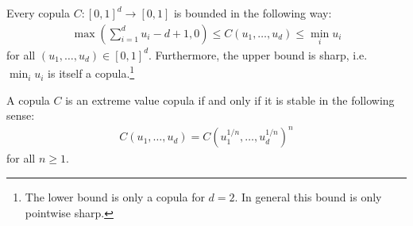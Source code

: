     \begin{property}
        Every copula $C:[0,1]^d\rightarrow[0,1]$ is bounded in the following way:
        \begin{gather}
        \max\left(\sum_{i=1}^du_i-d+1, 0\right)\leq C(u_1, \ldots, u_d)\leq \min_iu_i
        \end{gather}
        for all $(u_1, \ldots, u_d)\in[0,1]^d$. Furthermore, the upper bound is sharp, i.e. $\min_iu_i$ is itself a copula.\footnote{The lower bound is only a copula for $d=2$. In general this bound is only pointwise sharp.}
    \end{property}

    \begin{property}
        A copula $C$ is an extreme value copula if and only if it is stable in the following sense:
        \begin{gather}
        C(u_1, \ldots, u_d) = C(u_1^{1/n}, \ldots, u_d^{1/n})^n
        \end{gather}
        for all $n\geq1$.
    \end{property}